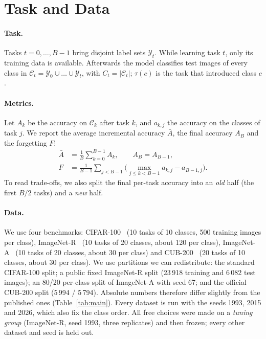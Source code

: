 \section{Task and Data}
\label{sec:task}

\paragraph{Task.}
Tasks $t=0,\dots,B-1$ bring disjoint label sets $\mathcal Y_t$. While learning
task $t$, only its training data is available. Afterwards the model classifies
test images of every class in $\mathcal C_t=\mathcal Y_0\cup\dots\cup\mathcal Y_t$,
with $C_t=|\mathcal C_t|$; $\tau(c)$ is the task that introduced class $c$.

\paragraph{Metrics.}
Let $A_k$ be the accuracy on $\mathcal C_k$ after task $k$, and $a_{k,j}$ the
accuracy on the classes of task $j$. We report the average incremental
accuracy $\bar A$, the final accuracy $A_B$ and the forgetting $F$:
\begin{align}
  \bar A&=\frac1B\sum_{k=0}^{B-1}A_k,\qquad A_B=A_{B-1},\label{eq:acc}\\
  F&=\frac1{B-1}\sum_{j<B-1}\Big(\max_{j\le k<B-1}a_{k,j}-a_{B-1,j}\Big).\label{eq:forget}
\end{align}
To read trade-offs, we also split the final per-task accuracy into an \emph{old} half
(the first $B/2$ tasks) and a \emph{new} half.

\paragraph{Data.}
We use four benchmarks: CIFAR-100~\citep{krizhevsky2009cifar} (10 tasks of 10
classes, 500 training images per class), ImageNet-R~\citep{hendrycks2021many}
(10 tasks of 20 classes, about 120 per class), ImageNet-A~\citep{hendrycks2021nae}
(10 tasks of 20 classes, about 30 per class) and CUB-200~\citep{wah2011cub}
(20 tasks of 10 classes, about 30 per class). We use partitions we can
redistribute: the standard CIFAR-100 split; a public fixed ImageNet-R split
(23\,918 training and 6\,082 test images); an 80/20 per-class split of
ImageNet-A with seed 67; and the official CUB-200 split (5\,994 / 5\,794).
Absolute numbers therefore differ slightly from the published ones
(Table~\ref{tab:main}). Every dataset is run with the seeds 1993, 2015 and 2026,
which also fix the class order. All free choices were made on a \emph{tuning
group} (ImageNet-R, seed 1993, three replicates) and then frozen; every other
dataset and seed is held out.
